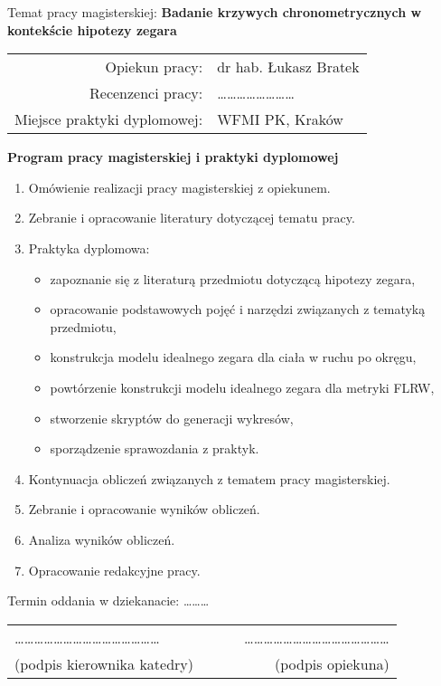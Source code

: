 {Temat pracy magisterskiej:
{\bf Badanie krzywych chronometrycznych w kontekście hipotezy zegara}\\

\begin{tabular}{rl}

Opiekun pracy:                  & dr hab. Łukasz Bratek\\
Recenzenci pracy:               & \dots \dots \dots \dots \dots \dots \dots \dots\\
Miejsce praktyki dyplomowej:    & WFMI PK, Kraków\\
\end{tabular}

\begin{center}
{\bf Program pracy magisterskiej i praktyki dyplomowej}
\end{center}

\begin{enumerate}
\item Omówienie realizacji pracy magisterskiej z opiekunem.
\item Zebranie i opracowanie literatury dotyczącej tematu pracy.
\item Praktyka dyplomowa:
\begin{itemize}
\item zapoznanie się z literaturą przedmiotu dotyczącą hipotezy zegara,
\item opracowanie podstawowych pojęć i narzędzi związanych z tematyką przedmiotu,
\item konstrukcja modelu idealnego zegara dla ciała w ruchu po okręgu,
\item powtórzenie konstrukcji modelu idealnego zegara dla metryki FLRW,
\item stworzenie skryptów do generacji wykresów,
\item sporządzenie sprawozdania z praktyk.
\end{itemize}
\item Kontynuacja obliczeń związanych z tematem pracy magisterskiej.
\item Zebranie i opracowanie wyników obliczeń.
\item Analiza wyników obliczeń.
\item Opracowanie redakcyjne pracy.
\end{enumerate}


\noindent
Termin oddania w dziekanacie: \dots \dots \dots\\[1cm]

\begin{center}
\begin{tabular}{lcr}
\dots\dots\dots\dots\dots\dots\dots\dots\dots\dots\dots\dots\dots\dots\dots & ~~~ &
\dots\dots\dots\dots\dots\dots\dots\dots\dots\dots\dots\dots\dots\dots\dots \\
(podpis kierownika katedry) & & (podpis opiekuna) \\
\end{tabular}
\end{center}

}
